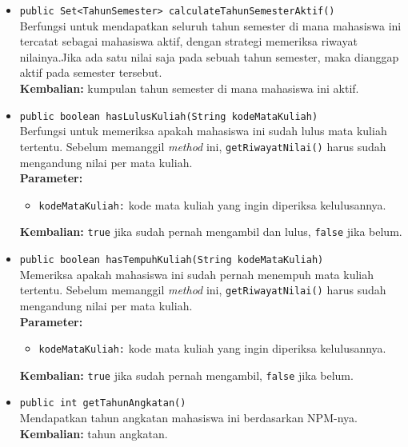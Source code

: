 \begin{itemize}
	\item \texttt{public Set<TahunSemester> calculateTahunSemesterAktif()}\\
		Berfungsi untuk mendapatkan seluruh tahun semester di mana mahasiswa ini tercatat sebagai mahasiswa aktif, dengan strategi memeriksa riwayat nilainya.Jika ada satu nilai saja pada sebuah tahun semester, maka dianggap aktif pada semester tersebut.\\
		\textbf{Kembalian:} kumpulan tahun semester di mana mahasiswa ini aktif.
		
	\item \texttt{public boolean hasLulusKuliah(String kodeMataKuliah)}\\
		Berfungsi untuk memeriksa apakah mahasiswa ini sudah lulus mata kuliah tertentu. Sebelum memanggil \textit{method} ini, \texttt{getRiwayatNilai()} harus sudah mengandung nilai per mata kuliah.\\
		\textbf{Parameter:}
		\begin{itemize}
			\item \texttt{kodeMataKuliah:} kode mata kuliah yang ingin diperiksa kelulusannya.
		\end{itemize}
		\textbf{Kembalian:} \texttt{true} jika sudah pernah mengambil dan lulus, \texttt{false} jika belum.
		
	\item \texttt{public boolean hasTempuhKuliah(String kodeMataKuliah)}\\
		Memeriksa apakah mahasiswa ini sudah pernah menempuh mata kuliah tertentu. Sebelum memanggil \textit{method} ini, \texttt{getRiwayatNilai()} harus sudah mengandung nilai per mata kuliah.\\
		\textbf{Parameter:}
		\begin{itemize}
			\item \texttt{kodeMataKuliah:} kode mata kuliah yang ingin diperiksa kelulusannya.
		\end{itemize}
		\textbf{Kembalian:} \texttt{true} jika sudah pernah mengambil, \texttt{false} jika belum.
	
	\item \texttt{public int getTahunAngkatan()}\\
		Mendapatkan tahun angkatan mahasiswa ini berdasarkan NPM-nya.\\
		\textbf{Kembalian:} tahun angkatan.
	\end{itemize}


